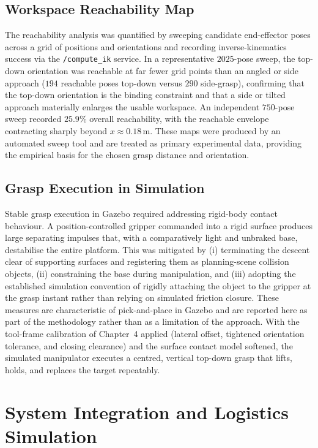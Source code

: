 \subsection{Workspace Reachability Map}
The reachability analysis was quantified by sweeping candidate end-effector poses across
a grid of positions and orientations and recording inverse-kinematics success via the
\texttt{/compute\_ik} service. In a representative $2025$-pose sweep, the top-down
orientation was reachable at far fewer grid points than an angled or side approach
($194$ reachable poses top-down versus $290$ side-grasp), confirming that the top-down
orientation is the binding constraint and that a side or tilted approach materially
enlarges the usable workspace. An independent $750$-pose sweep recorded $25.9\%$ overall
reachability, with the reachable envelope contracting sharply beyond $x\approx0.18$\,m.
These maps were produced by an automated sweep tool and are treated as primary
experimental data, providing the empirical basis for the chosen grasp distance and
orientation.

\subsection{Grasp Execution in Simulation}
Stable grasp execution in Gazebo required addressing rigid-body contact behaviour. A
position-controlled gripper commanded into a rigid surface produces large separating
impulses that, with a comparatively light and unbraked base, destabilise the entire
platform. This was mitigated by (i) terminating the descent clear of supporting
surfaces and registering them as planning-scene collision objects, (ii) constraining
the base during manipulation, and (iii) adopting the established simulation convention
of rigidly attaching the object to the gripper at the grasp instant rather than relying
on simulated friction closure. These measures are characteristic of pick-and-place in
Gazebo and are reported here as part of the methodology rather than as a limitation of
the approach. With the tool-frame calibration of Chapter~4 applied (lateral offset,
tightened orientation tolerance, and closing clearance) and the surface contact model
softened, the simulated manipulator executes a centred, vertical top-down grasp that
lifts, holds, and replaces the target repeatably.

\section{System Integration and Logistics Simulation}

